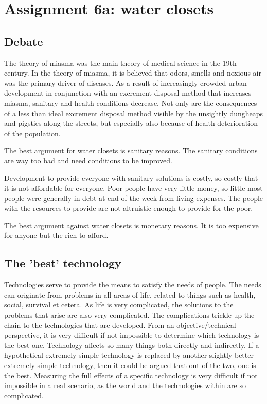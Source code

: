 \section*{Assignment 6a: water closets}

\subsection*{Debate}
The theory of miasma was the main theory of medical science in the 19th century. In the theory of miasma, it is believed that odors, smells and noxious air was the primary driver of diseases.
As a result of increasingly crowded urban development in conjunction with an excrement disposal method that increases miasma, sanitary and health conditions decrease.
Not only are the consequences of a less than ideal excrement disposal method visible by the unsightly dungheaps and pigsties along the streets, but especially also because of health deterioration of the population.

The best argument for water closets is sanitary reasons. The sanitary conditions are way too bad and need conditions to be improved.

Development to provide everyone with sanitary solutions is costly, so costly that it is not affordable for everyone.
Poor people have very little money, so little most people were generally in debt at end of the week from living expenses.
The people with the resources to provide are not altruistic enough to provide for the poor.

The best argument against water closets is monetary reasons. It is too expensive for anyone but the rich to afford.

\subsection*{The 'best' technology}
Technologies serve to provide the means to satisfy the needs of people. The needs can originate from problems in all areas of life, related to things such as health, social, survival et cetera.
As life is very complicated, the solutions to the problems that arise are also very complicated. The complications trickle up the chain to the technologies that are developed.
From an objective/technical perspective, it is very difficult if not impossible to determine which technology is the best one. Technology affects so many things both directly and indirectly.
If a hypothetical extremely simple technology is replaced by another slightly better extremely simple technology, then it could be argued that out of the two, one is the best.
Measuring the full effects of a specific technology is very difficult if not impossible in a real scenario, as the world and the technologies within are so complicated.

